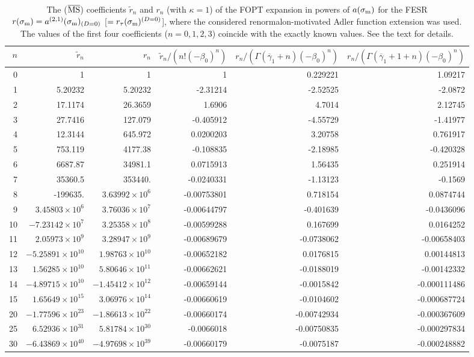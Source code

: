 \documentclass[aps,nofootinbib,showkeys,noshowpacs,preprintnumbers,amsmath,amssymb]{revtex4}
\newcommand{\sm}{{\sigma_{\rm m}}}
\newcommand{\tr}{{\widetilde r}}
\newcommand{\bg}{{\overline {\gamma}}}
\newcommand{\MSbar}{\overline{\rm MS}}
\begin{document}
\begin{table}
  \caption{The ($\MSbar$) coefficients $\tr_n$ and $r_n$ (with $\kappa=1$) of the FOPT expansion in powers of $a(\sm)$ for the FESR $r(\sm) = a^{(2,1)}(\sm)_{(D=0)}$ [$=r_{\tau}(\sm)^{(D=0)}$], where the considered renormalon-motivated Adler function extension was used. The values of the first four coefficients ($n=0,1,2,3$) coincide with the exactly known values. See the text for details.}
\label{tabtrnrn}
\begin{ruledtabular}
\begin{tabular}{r|rr|rrr}
 $n$ & $\tr_n$ & $r_n$ & $\tr_n/(n! (-\beta_0)^n)$  & $r_n/(\Gamma(\bg_1+n)(-\beta_0)^n)$ & $r_n/(\Gamma(\bg_1+1+n)(-\beta_0)^n)$ 
\\
\hline
0       &  1       & 1         &  1  & 0.229221  & 1.09217 \\
1       &  5.20232 & 5.20232   &  -2.31214  & -2.52525   & -2.0872 \\
2       &  17.1174 & 26.3659 &  1.6906  &  4.7014   & 2.12745 \\
3       &  27.7416 & 127.079 &  -0.405912  & -4.55729  & -1.41977 \\
4       &  12.3144 & 645.972 &  0.0200203  & 3.20758  & 0.761917 \\
5       &  753.119 & 4177.38 & -0.108835 & -2.18985  & -0.420328 \\
6       &  6687.87 & 34981.1 & 0.0715913 & 1.56435  & 0.251914 \\
7       & 35360.5 & 353440. & -0.0240331 & -1.13123 &  -0.1569 \\
8       & -199635. & $3.63992 \times 10^{6}$ & -0.00753801  & 0.718154 & 0.0874744 \\
9       & $3.45803 \times 10^{6}$ & $3.76036 \times 10^{7}$ & -0.00644797 & -0.401639  & -0.0436096 \\
10      & $-7.23142 \times 10^{7}$ & $3.25358 \times 10^{8}$ & -0.00599288 & 0.167699  & 0.0164252 \\
11      & $2.05973 \times 10^{9}$ & $3.28947 \times 10^{9}$ & -0.00689679 & -0.0738062  & -0.00658403 \\
12      & $-5.25891 \times 10^{10}$ & $1.98763 \times 10^{10}$ & -0.00652182 & 0.0176815  & 0.00144813 \\
13      & $1.56285 \times 10^{10}$ & $5.80646 \times 10^{11}$ & -0.00662621 & -0.0188019  & -0.00142332 \\
14      & $-4.89715 \times 10^{10}$ & $-1.45412 \times 10^{12}$ & -0.00659144 & -0.0015842  & -0.000111486 \\
15      & $1.65649 \times 10^{15}$ & $3.06976 \times 10^{14}$ & -0.00660619 & -0.0104602 & -0.000687724 \\
\hline
20      & $-1.77596 \times 10^{23}$ & $-1.86613 \times 10^{22}$ & -0.00660174  & -0.00742934 & -0.000367609 \\
\hline
25      & $6.52936 \times 10^{31}$ & $5.81784 \times 10^{30}$ & -0.0066018  & -0.00750835 & -0.000297834 \\
\hline
30      & $-6.43869 \times 10^{40}$ & $-4.97698 \times 10^{39}$ & -0.00660179 & -0.0075187 & -0.000248882 
\end{tabular}
\end{ruledtabular}
\end{table}
\end{document}
